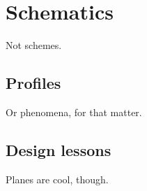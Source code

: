 \chapter{Schematics}

Not schemes.

\section{Profiles}
Or phenomena, for that matter.

\section{Design lessons}

Planes are cool, though.